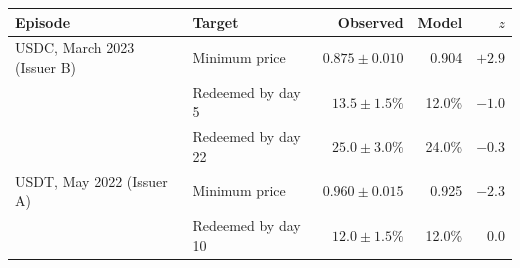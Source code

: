 \begin{tabular}{@{}llrrr@{}}
\toprule
Episode & Target & Observed & Model & $z$ \\
\midrule
USDC, March 2023 (Issuer B) & Minimum price & $0.875 \pm 0.010$ & 0.904 & $+2.9$ \\
 & Redeemed by day 5 & $13.5 \pm 1.5\%$ & 12.0\% & $-1.0$ \\
 & Redeemed by day 22 & $25.0 \pm 3.0\%$ & 24.0\% & $-0.3$ \\
\addlinespace
USDT, May 2022 (Issuer A) & Minimum price & $0.960 \pm 0.015$ & 0.925 & $-2.3$ \\
 & Redeemed by day 10 & $12.0 \pm 1.5\%$ & 12.0\% & 0.0 \\
\bottomrule
\end{tabular}
